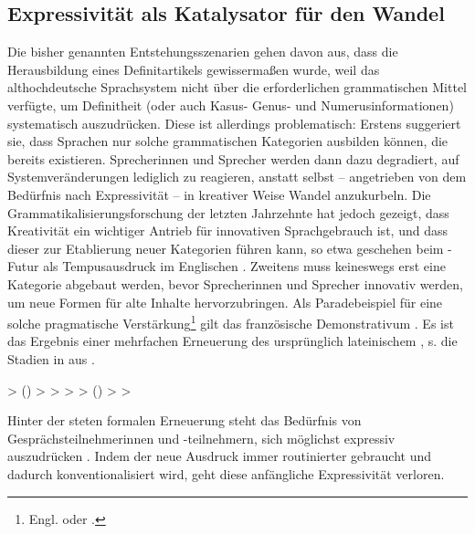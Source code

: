 \subsection{Expressivität als Katalysator für den Wandel} \label{sec:kata}

Die bisher genannten Entstehungsszenarien gehen davon aus, dass die Herausbildung eines Definitartikels gewissermaßen  wurde, weil das althochdeutsche Sprachsystem nicht über die erforderlichen grammatischen Mittel verfügte, um Definitheit (oder auch Kasus- Genus- und Numerusinformationen) systematisch auszudrücken. Diese  ist allerdings problematisch: Erstens suggeriert sie, dass Sprachen nur solche grammatischen Kategorien ausbilden können, die bereits existieren. Sprecherinnen und Sprecher werden dann dazu degradiert, auf Systemveränderungen lediglich zu reagieren, anstatt selbst -- angetrieben von dem Bedürfnis nach Expressivität -- in kreativer Weise Wandel anzukurbeln. Die Grammatikalisierungsforschung der letzten Jahrzehnte hat jedoch gezeigt, dass Kreativität ein wichtiger Antrieb für innovativen Sprachgebrauch ist, und dass dieser zur Etablierung neuer Kategorien führen kann, so etwa geschehen beim -Futur als Tempusausdruck im Englischen \parencite[s. z.B.][30ff]{Heine1991}. Zweitens muss keineswegs erst eine Kategorie abgebaut werden, bevor Sprecherinnen und Sprecher innovativ werden, um neue Formen für alte Inhalte hervorzubringen. Als Paradebeispiel für eine solche pragmatische Verstärkung\footnote{Engl.  oder  \parencite[s.][94]{Hopper2006}.} gilt das französische Demonstrativum . Es ist das Ergebnis einer mehrfachen Erneuerung des ursprünglich lateinischem , s. die Stadien in  aus \textcite[94]{Hopper2006}. 

\begin{exe}
	\ex \label{ex:ca}   > ()    >  >  >  > ()  >  > 
\end{exe}

Hinter der steten formalen Erneuerung steht das Bedürfnis von Gesprächsteilnehmerinnen und -teilnehmern, sich möglichst expressiv auszudrücken \parencites[179]{Detges2002}[73]{Hopper2006}[176]{Lehmann2015}. Indem der neue Ausdruck immer routinierter gebraucht und dadurch konventionalisiert wird, geht diese anfängliche Expressivität verloren. 

